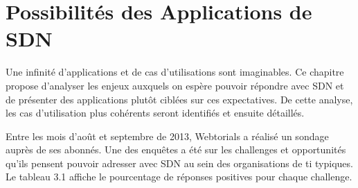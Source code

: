 
\chapter{Possibilités des Applications de SDN}


Une infinité d'applications et de cas d'utilisations sont imaginables. Ce chapitre propose d'analyser les enjeux auxquels on espère pouvoir répondre avec SDN et de présenter des applications plutôt ciblées sur ces expectatives. De cette analyse, les cas d'utilisation plus cohérents seront identifiés et ensuite détaillés.

 

Entre les mois d'août et septembre de 2013, Webtorials a réalisé un sondage auprès de ses abonnés. Une des enquêtes a été sur les challenges et opportunités qu'ils pensent pouvoir adresser avec SDN au sein des organisations de \gls{ti} typiques. Le tableau 3.1 affiche le pourcentage de réponses positives pour chaque challenge. \cite{2013GuideSDNNVUseCases}

